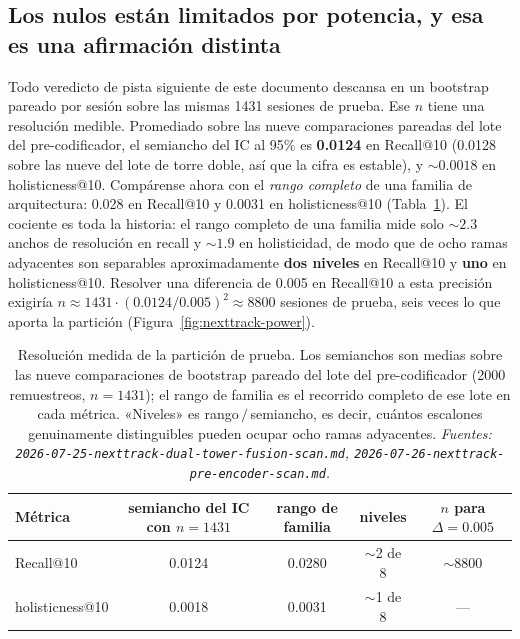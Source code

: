 \documentclass[11pt]{article}
\begin{document}
\subsection{Los nulos están limitados por potencia, y esa es una afirmación distinta}
\label{sec:nexttrack-power-stats}
Todo veredicto de pista siguiente de este documento descansa en un bootstrap
pareado por sesión
sobre las mismas \num{1431} sesiones de prueba. Ese $n$ tiene una resolución
medible. Promediado sobre las nueve comparaciones pareadas del lote del
pre-codificador, el semiancho del IC al 95\% es \textbf{\num{0.0124}} en
Recall@10 (\num{0.0128} sobre las nueve del lote de torre doble, así que la cifra
es estable), y \textbf{${\sim}\num{0.0018}$} en holisticness@10. Compárense ahora
con el \emph{rango completo} de una familia de arquitectura: \num{0.028} en
Recall@10 y \num{0.0031} en holisticness@10 (Tabla~\ref{tab:nexttrack-power}). El cociente
es toda la historia: el rango completo de una familia mide solo ${\sim}2.3$
anchos de resolución en recall y ${\sim}1.9$ en holisticidad, de modo que de ocho
ramas adyacentes son separables aproximadamente \textbf{dos niveles} en Recall@10
y \textbf{uno} en holisticness@10. Resolver una diferencia de \num{0.005} en
Recall@10 a esta precisión exigiría
$n \approx 1431\cdot(\num{0.0124}/\num{0.005})^2 \approx \num{8800}$ sesiones de
prueba, seis veces lo que aporta la partición
(Figura~\ref{fig:nexttrack-power}).

\begin{table}[ht]
  \centering
  \caption{Resolución medida de la partición de prueba. Los semianchos son medias
  sobre las nueve comparaciones de bootstrap pareado del lote del
  pre-codificador (\num{2000} remuestreos, $n=\num{1431}$); el rango de familia
  es el recorrido completo de ese lote en cada métrica. «Niveles» es
  rango\,$/$\,semiancho, es decir, cuántos escalones genuinamente distinguibles
  pueden ocupar ocho ramas adyacentes. \emph{Fuentes:
  \texttt{2026-07-25-nexttrack-dual-tower-fusion-scan.md},
  \texttt{2026-07-26-nexttrack-pre-encoder-scan.md}.}}
  \label{tab:nexttrack-power}
  {\footnotesize\setlength{\tabcolsep}{6pt}\begin{tabular}{lcccc}
    \toprule
    Métrica & semiancho del IC con $n=\num{1431}$ & rango de familia & niveles & $n$ para $\Delta=\num{0.005}$ \\
    \midrule
    Recall@10 & 0.0124 & 0.0280 & $\sim$2 de 8 & $\sim$\num{8800} \\
    holisticness@10 & 0.0018 & 0.0031 & $\sim$1 de 8 & --- \\
    \bottomrule
  \end{tabular}}
\end{table}
\end{document}
